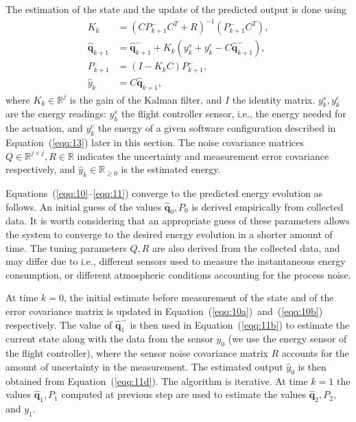 \documentclass[letterpaper,10pt,conference]{ieeeconf}
\begin{document}
The estimation of the state and the update of the predicted output is done using
\begin{subequations}\label{eqq:11}\begin{align}
  K_k&=(CP_{k+1}^-C^T+R)^{-1}(P_{k+1}^-C^T),\\
  \hat{\mathbf{q}}_{k+1}&=\hat{\mathbf{q}}_{k+1}^-+K_k(y_k^s+y_k^c-C\hat{\mathbf{q}}_{k+1}^-),\label{eqq:11b}\\
  P_{k+1}&=(I-K_kC)P_{k+1}^-,\\
  \hat{y}_k&=C\hat{\mathbf{q}}_{k+1},\label{eqq:11d}
\end{align}
\end{subequations}
where $K_k\in\mathbb{R}^j$ is the gain of the Kalman filter, and $I$ the identity matrix. $y_k^s,y_k^c$ are the energy readings: $y_k^s$ the flight controller sensor, i.e., the energy needed for the actuation, and $y_k^c$ the energy of a given software configuration described in Equation~(\ref{eqq:13}) later in this section. The noise covariance matrices $Q\in\mathbb{R}^{j\times j},R\in\mathbb{R}$ indicates the uncertainty and measurement error covariance respectively, and $\hat{y}_k\in\mathbb{R}_{\geq 0}$ is the estimated energy.

Equations~(\ref{eqq:10}--\ref{eqq:11}) converge to the predicted energy evolution as follows. An initial guess of the values $\hat{\mathbf{q}}_0,P_0$ is derived empirically from collected data. It is worth considering that an appropriate guess of these parameters allows the system to converge to the desired energy evolution in a shorter amount of time. The tuning parameters $Q,R$ are also derived from the collected data, and may differ due to i.e., different sensors used to measure the instantaneous energy consumption, or different atmospheric conditions accounting for the process noise.

At time $k=0$, the initial estimate before measurement of the state and of the error covariance matrix is updated in Equation~(\ref{eqq:10a})~and~(\ref{eqq:10b}) respectively. The value of $\hat{\mathbf{q}}_1^-$ is then used in Equation~(\ref{eqq:11b}) to estimate the current state along with the data from the sensor $y_0$ (we use the energy sensor of the flight controller), where the sensor noise covariance matrix $R$ accounts for the amount of uncertainty in the measurement. The estimated output $\hat{y}_0$ is then obtained from Equation~(\ref{eqq:11d}). The algorithm is iterative. At time $k=1$ the values $\hat{\mathbf{q}}_1,P_1$ computed at previous step are used to estimate the values $\hat{\mathbf{q}}_2,P_2,$ and $y_1$.
\end{document}
